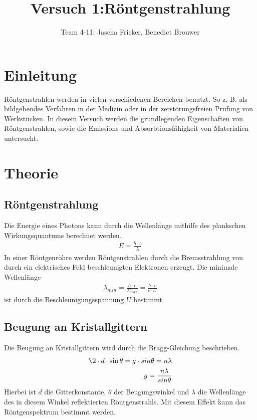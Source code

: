 \documentclass[11pt, a4paper]{article}
\title{Versuch 1:Röntgenstrahlung}
\author{Team 4-11: Jascha Fricker, Benedict Brouwer}
\begin{document}
    \maketitle

    \tableofcontents

    \newpage

    \section{Einleitung}

    Röntgenstrahlen werden in vielen verschiedenen Bereichen benutzt. So z. B. als bildgebendes Verfahren in der Medizin oder in der zerstörungsfreien Prüfung von Werkstücken. In diesem Versuch werden die grundlegenden Eigenschaften von Röntgenstrahlen, sowie die Emissions und Absorbtionsfähigkeit von Materialien untersucht.

    \section{Theorie}

    \subsection{Röntgenstrahlung}

    Die Energie eines Photons kann durch die Wellenlänge mithilfe des plankschen Wirkungsquantums berechnet werden.
    \begin{align}
        E = \frac{h \cdot c}{\lambda}
    \end{align}
    In einer Röntgenröhre werden Röntgenstrahlen durch die Bremsstrahlung von durch ein elektrisches Feld beschleunigten Elektronen erzeugt. Die minimale Wellenlänge
    \begin{align}
        \lambda_{min} = \frac{h \cdot c}{E_{max}} = \frac{h \cdot c}{e \cdot U}
    \end{align}
    ist durch die Beschleunigungsspannung $U$ bestimmt.

    \subsection{Beugung an Kristallgittern}

    Die Beugung an Kristallgittern wird durch die Bragg-Gleichung beschrieben.
    \begin{align}
        \2 \cdot d \cdot \sin \theta = g \cdot sin \theta = n \lambda \\
        g = \frac{n \lambda}{sin \theta} \label{eq:gitter}
    \end{align}
    Hierbei ist $d$ die Gitterkonstante, $\theta$ der Beugungswinkel und $\lambda$ die Wellenlänge des in diesem Winkel reflektierten Röntgenstrahls. Mit diesem Effekt kann das Röntgenspektrum bestimmt werden.
\end{document}
